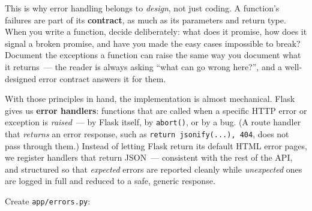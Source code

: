 This is why error handling belongs to \emph{design}, not just coding. A function's failures are part of its \textbf{contract}, as much as its parameters and return type. When you write a function, decide deliberately: what does it promise, how does it signal a broken promise, and have you made the easy cases impossible to break? Document the exceptions a function can raise the same way you document what it returns~--- the reader is always asking ``what can go wrong here?'', and a well-designed error contract answers it for them.

With those principles in hand, the implementation is almost mechanical. Flask gives us \textbf{error handlers}: functions that are called when a specific HTTP error or exception is \emph{raised}~--- by Flask itself, by \texttt{abort()}, or by a bug. (A route handler that \emph{returns} an error response, such as \texttt{return\ jsonify(.}\allowbreak{}\texttt{.}\allowbreak{}\texttt{.}\allowbreak{}\texttt{),}\allowbreak{}\texttt{\ 404}, does not pass through them.) Instead of letting Flask return its default HTML error pages, we register handlers that return JSON~--- consistent with the rest of the API, and structured so that \emph{expected} errors are reported cleanly while \emph{unexpected} ones are logged in full and reduced to a safe, generic response.

Create \texttt{app/errors.py}:

